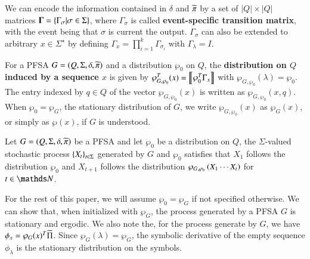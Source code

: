 \begin{defn}
\label{defn:GammaExpr}
We can encode the information contained in $\delta$ and $\widetilde{\pi}$ by a set of $|Q| \times |Q|$ matrices $\boldsymbol{\Gamma} = \left\{ \Gamma_\sigma| \sigma\in\Sigma \right\}$, where
$\Gamma_\sigma$ is called \textbf{event-specific transition matrix}, with the event being that $\sigma$ is current the output. $\Gamma_\sigma$ can also be extended to arbitrary $x\in\Sigma^{\star}$ by defining $\Gamma_{x} = \prod_{i = 1}^{k}\Gamma_{\sigma_i}$ with $\Gamma_{\lambda} = I$.
\end{defn}
 
\begin{defn}
\label{defn:InducedDistr}
For a PFSA $G = \left( Q, \Sigma, \delta, \widetilde{\pi} \right)$ and a distribution $\wp_0$ on $Q$, the \textbf{distribution on $Q$ induced by a sequence $x$} is given by $\wp^{T}_{G, \wp_0}(x) = \left\llbracket{\wp_0^{T}\Gamma_{x}}\right\rrbracket$ with $\wp_{G, \wp_0}(\lambda) = \wp_0$. The entry indexed by $q\in Q$ of the vector $\wp_{G, \wp_0}(x)$ is written as $\wp_{G, \wp_0}(x, q)$. When $\wp_0=\wp_{G}$, the stationary distribution of $G$, we write $\wp_{G, \wp_0}(x)$ as $\wp_{G}(x)$, or simply as $\wp(x)$, if $G$ is understood.
\end{defn}

\begin{defn}
\label{defn:StochasticProcessOfPFSA}
Let $G=\left( Q, \Sigma, \delta, \widetilde{\pi} \right)$ be a PFSA and let $\wp_0$ be a distribution on $Q$, the $\Sigma$-valued stochastic process $\left\{ X_t \right\}_{t\in\Sigma}$ generated by $G$ and $\wp_0$ satisfies that $X_1$ follows the distribution $\wp_0$ and $X_{t+1}$ follows the distribution $\wp_{G, \wp_0}\left( X_{1}\cdots X_{t} \right)$ for $t\in\N$.
\end{defn}
For the rest of this paper, we will assume $\wp_0 = \wp_G$ if not specified otherwise. We can show that, when initialized with $\wp_G$, the process generated by a PFSA $G$ is stationary and ergodic. We also note the, for the process generate by $G$, we have $\phi_x = \wp_G(x)^{T}\widetilde{\Pi}$. Since $\wp_G(\lambda) = \wp_{G}$, the symbolic derivative of the empty sequence $\phi_\lambda$ is the stationary distribution on the symbols. 

